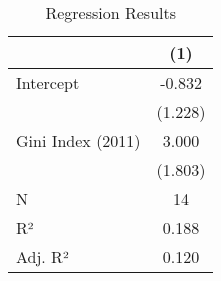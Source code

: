 \begin{table}[t]
\caption{Regression Results}
\fontsize{7.5pt}{9.0pt}\selectfont
\begin{tabular*}{\linewidth}{@{\extracolsep{\fill}}lc}
\toprule
  & (1) \\ 
\midrule\addlinespace[2.5pt]
Intercept & -0.832 \\ 
 & (1.228) \\ 
Gini Index (2011) & 3.000 \\ 
{} & {(1.803)} \\ 
\midrule
N & 14 \\ 
R² & 0.188 \\ 
Adj. R² & 0.120 \\ 
\bottomrule
\end{tabular*}
\end{table}

